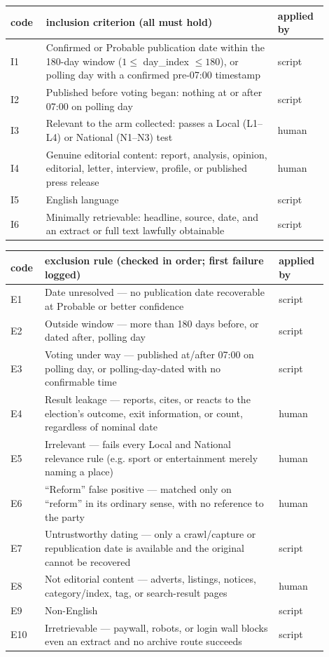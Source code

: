 \begin{tabular}{p{0.10\linewidth}p{0.66\linewidth}p{0.14\linewidth}}
\toprule
code & inclusion criterion (all must hold) & applied by \\
\midrule
I1 & Confirmed or Probable publication date within the 180-day window ($1 \leq$ day\_index $\leq 180$), or polling day with a confirmed pre-07:00 timestamp & script \\
I2 & Published before voting began: nothing at or after 07:00 on polling day & script \\
I3 & Relevant to the arm collected: passes a Local (L1--L4) or National (N1--N3) test & human \\
I4 & Genuine editorial content: report, analysis, opinion, editorial, letter, interview, profile, or published press release & human \\
I5 & English language & script \\
I6 & Minimally retrievable: headline, source, date, and an extract or full text lawfully obtainable & script \\
\bottomrule
\end{tabular}

\vspace{1.2em}

\begin{tabular}{p{0.08\linewidth}p{0.68\linewidth}p{0.14\linewidth}}
\toprule
code & exclusion rule (checked in order; first failure logged) & applied by \\
\midrule
E1 & Date unresolved --- no publication date recoverable at Probable or better confidence & script \\
E2 & Outside window --- more than 180 days before, or dated after, polling day & script \\
E3 & Voting under way --- published at/after 07:00 on polling day, or polling-day-dated with no confirmable time & script \\
E4 & Result leakage --- reports, cites, or reacts to the election's outcome, exit information, or count, regardless of nominal date & human \\
E5 & Irrelevant --- fails every Local and National relevance rule (e.g. sport or entertainment merely naming a place) & human \\
E6 & ``Reform'' false positive --- matched only on ``reform'' in its ordinary sense, with no reference to the party & human \\
E7 & Untrustworthy dating --- only a crawl/capture or republication date is available and the original cannot be recovered & script \\
E8 & Not editorial content --- adverts, listings, notices, category/index, tag, or search-result pages & human \\
E9 & Non-English & script \\
E10 & Irretrievable --- paywall, robots, or login wall blocks even an extract and no archive route succeeds & script \\
\bottomrule
\end{tabular}

